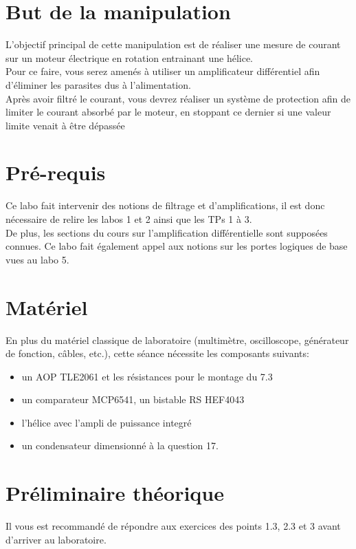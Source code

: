 \documentclass{../template/labo}
\author{The Fantastic Four} %
\begin{document}

\section{But de la manipulation}

L'objectif principal de cette manipulation est de réaliser une mesure de courant sur un moteur
électrique en rotation entrainant une hélice.\\
Pour ce faire, vous serez amenés à utiliser un amplificateur différentiel afin d'éliminer les parasites
dus à l'alimentation.\\
Après avoir filtré le courant, vous devrez réaliser un système de protection afin de limiter le courant
absorbé par le moteur, en stoppant ce dernier si une valeur limite venait à être dépassée

\section{Pré-requis}
Ce labo fait intervenir des notions de filtrage et d'amplifications, il est donc nécessaire de relire les
labos 1 et 2 ainsi que les TPs 1 à 3.\\
De plus, les sections du cours sur l'amplification différentielle sont supposées connues. Ce labo fait
également appel aux notions sur les portes logiques de base vues au labo 5.

\section{Matériel}
En plus du matériel classique de laboratoire (multimètre, oscilloscope, générateur de fonction, câbles, etc.), cette séance nécessite les composants suivants:
\begin{itemize}
\item un AOP TLE2061 et les résistances pour le montage du 7.3
\item un comparateur MCP6541, un bistable RS HEF4043
\item l'hélice avec l'ampli de puissance integré
\item un condensateur dimensionné à la question 17.
\end{itemize}

\newpage
\section{Préliminaire théorique} %
Il vous est recommandé de répondre aux exercices des points 1.3, 2.3 et 3 avant d'arriver au
laboratoire.
\end{document}
